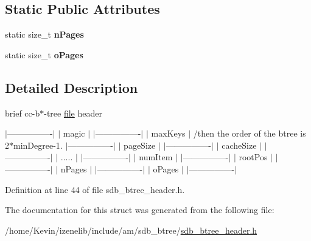 \subsection*{Static Public Attributes}
\begin{CompactItemize}
\item 
\hypertarget{structCbFileHeader_b32ba1b645c6b17aa04ee839790515c5}{
static size\_\-t \textbf{nPages}}
\label{structCbFileHeader_b32ba1b645c6b17aa04ee839790515c5}

\item 
\hypertarget{structCbFileHeader_18144c299e50c2025dd1bbed044b61a3}{
static size\_\-t \textbf{oPages}}
\label{structCbFileHeader_18144c299e50c2025dd1bbed044b61a3}

\end{CompactItemize}


\subsection{Detailed Description}
brief cc-b$\ast$-tree \hyperlink{classfile}{file} header

$|$----------------$|$ $|$ magic $|$ $|$----------------$|$ $|$ maxKeys $|$ /then the order of the btree is 2$\ast$minDegree-1. $|$----------------$|$ $|$ pageSize $|$ $|$----------------$|$ $|$ cacheSize $|$ $|$----------------$|$ $|$ ..... $|$ $|$----------------$|$ $|$ numItem $|$ $|$----------------$|$ $|$ rootPos $|$ $|$----------------$|$ $|$ nPages $|$ $|$----------------$|$ $|$ oPages $|$ $|$----------------$|$ 

Definition at line 44 of file sdb\_\-btree\_\-header.h.

The documentation for this struct was generated from the following file:\begin{CompactItemize}
\item 
/home/Kevin/izenelib/include/am/sdb\_\-btree/\hyperlink{sdb__btree__header_8h}{sdb\_\-btree\_\-header.h}\end{CompactItemize}
